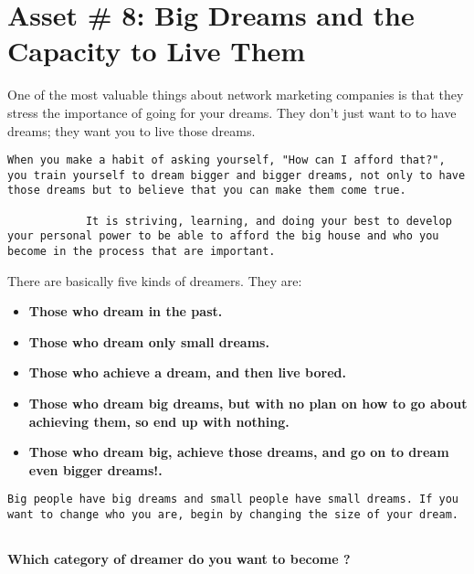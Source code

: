 \documentclass[a4paper, 12pt]{report}
\begin{document}
    \chapter{Asset \# 8: Big Dreams and the Capacity to Live Them}
    One of the most valuable things about network marketing companies is that they stress the importance of going for your dreams. They don't just want to to have dreams; they want you to live those dreams.
    
     \begin{lstlisting}[style=latexFrameTB]
            When you make a habit of asking yourself, "How can I afford that?", you train yourself to dream bigger and bigger dreams, not only to have those dreams but to believe that you can make them come true.
            
            It is striving, learning, and doing your best to develop your personal power to be able to afford the big house and who you become in the process that are important.
    \end{lstlisting}
    There are basically five kinds of dreamers. They are:
    \begin{itemize}
        \item \textbf{Those who dream in the past.}
        \item \textbf{Those who dream only small dreams.}
        \item \textbf{Those who achieve a dream, and then live bored.}
        \item \textbf{Those who dream big dreams, but with no plan on how to go about achieving them, so end up with nothing.}
        \item \textbf{Those who dream big, achieve those dreams, and go on to dream even bigger dreams!.}
        
    \end{itemize}
     \begin{lstlisting}[style=latexFrameTB]
           Big people have big dreams and small people have small dreams. If you want to change who you are, begin by changing the size of your dream.
            
    \end{lstlisting}
    \begin{framedquest*}
       \textbf{Which category of dreamer do you want to become ?}
       
    \end{framedquest*}
    
    
    
    

   
\end{document}
